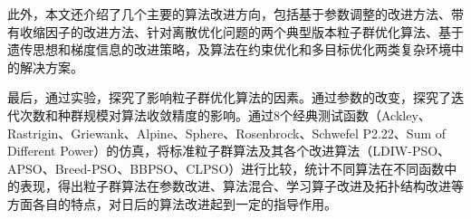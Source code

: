 此外，本文还介绍了几个主要的算法改进方向，包括基于参数调整的改进方法、带有收缩因子的改进方法、针对离散优化问题的两个典型版本粒子群优化算法、基于遗传思想和梯度信息的改进策略，及算法在约束优化和多目标优化两类复杂环境中的解决方案。

最后，通过实验，探究了影响粒子群优化算法的因素。通过参数的改变，探究了迭代次数和种群规模对算法收敛精度的影响。通过8个经典测试函数（Ackley、Rastrigin、Griewank、Alpine、Sphere、Rosenbrock、Schwefel P2.22、Sum of Different Power）的仿真，将标准粒子群算法及其各个改进算法（LDIW-PSO、APSO、Breed-PSO、BBPSO、CLPSO）进行比较，统计不同算法在不同函数中的表现，得出粒子群算法在参数改进、算法混合、学习算子改进及拓扑结构改进等方面各自的特点，对日后的算法改进起到一定的指导作用。





